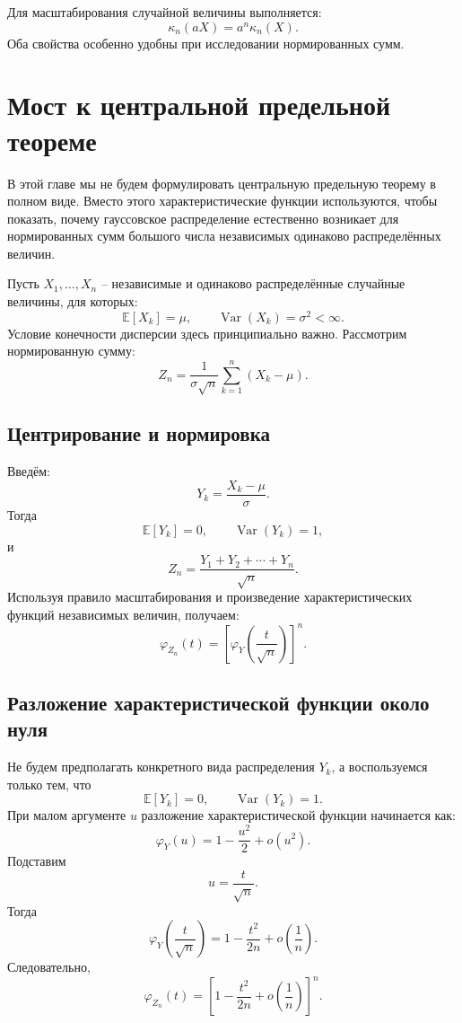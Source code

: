 \documentclass[
  russian,
  12pt,
  a4paper,
  a4paper,
  openany]{scrbook}
\begin{document}
Для масштабирования случайной величины выполняется: \[\boxed{
\kappa_n(aX)
=
a^n\kappa_n(X).
}\] Оба свойства особенно удобны при исследовании нормированных сумм.

\section{Мост к центральной предельной
теореме}\label{ux43cux43eux441ux442-ux43a-ux446ux435ux43dux442ux440ux430ux43bux44cux43dux43eux439-ux43fux440ux435ux434ux435ux43bux44cux43dux43eux439-ux442ux435ux43eux440ux435ux43cux435}

В этой главе мы не будем формулировать центральную предельную теорему в
полном виде. Вместо этого характеристические функции используются, чтобы
показать, почему гауссовское распределение естественно возникает для
нормированных сумм большого числа независимых одинаково распределённых
величин.

Пусть \(X_1,\ldots,X_n\) -- независимые и одинаково распределённые
случайные величины, для которых: \[\mathbb{E}[X_k]=\mu,
\qquad
\operatorname{Var}(X_k)=\sigma^2<\infty.\] Условие конечности дисперсии
здесь принципиально важно. Рассмотрим нормированную сумму: \[\boxed{
Z_n
=
\frac{1}{\sigma\sqrt n}
\sum_{k=1}^{n}(X_k-\mu).
}\]

\subsection{Центрирование и
нормировка}\label{ux446ux435ux43dux442ux440ux438ux440ux43eux432ux430ux43dux438ux435-ux438-ux43dux43eux440ux43cux438ux440ux43eux432ux43aux430}

Введём: \[Y_k
=
\frac{X_k-\mu}{\sigma}.\] Тогда \[\mathbb{E}[Y_k]=0,
\qquad
\operatorname{Var}(Y_k)=1,\] и \[Z_n
=
\frac{Y_1+Y_2+\cdots+Y_n}{\sqrt n}.\] Используя правило масштабирования
и произведение характеристических функций независимых величин, получаем:
\[\boxed{
\varphi_{Z_n}(t)
=
\left[
\varphi_Y\!\left(\frac{t}{\sqrt n}\right)
\right]^n.
}\]

\subsection{Разложение характеристической функции около
нуля}\label{ux440ux430ux437ux43bux43eux436ux435ux43dux438ux435-ux445ux430ux440ux430ux43aux442ux435ux440ux438ux441ux442ux438ux447ux435ux441ux43aux43eux439-ux444ux443ux43dux43aux446ux438ux438-ux43eux43aux43eux43bux43e-ux43dux443ux43bux44f}

Не будем предполагать конкретного вида распределения \(Y_k\), а
воспользуемся только тем, что \[\mathbb{E}[Y_k]=0,
\qquad
\operatorname{Var}(Y_k)=1.\] При малом аргументе \(u\) разложение
характеристической функции начинается как: \[\varphi_Y(u)
=
1-\frac{u^2}{2}+o(u^2).\] Подставим \[u=\frac{t}{\sqrt n}.\] Тогда
\[\varphi_Y\!\left(\frac{t}{\sqrt n}\right)
=
1-
\frac{t^2}{2n}
+o\!\left(\frac{1}{n}\right).\] Следовательно, \[\boxed{
\varphi_{Z_n}(t)
=
\left[
1-
\frac{t^2}{2n}
+o\!\left(\frac{1}{n}\right)
\right]^n.
}\]
\end{document}
